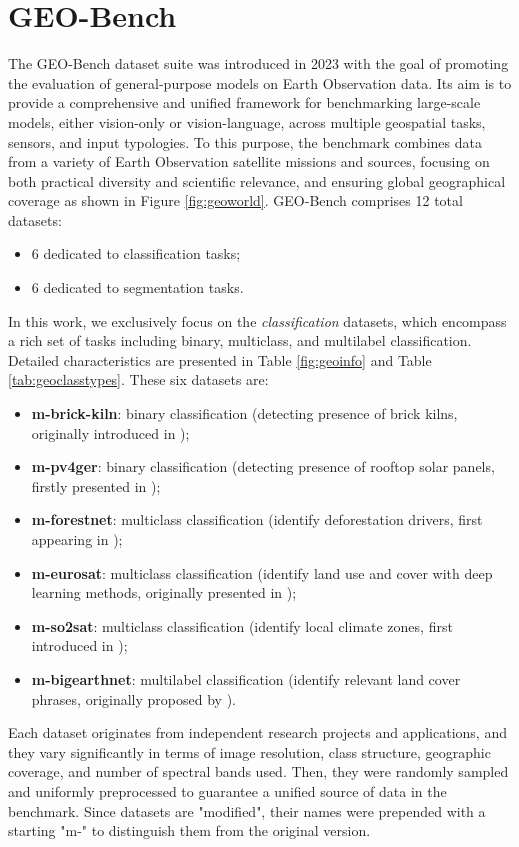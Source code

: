 \documentclass[a4paper, twoside, english]{sapthesis} %
\begin{document}
\section{GEO-Bench}

The GEO-Bench dataset suite \cite{lacoste2023geo} was introduced in 2023 with the goal of promoting the evaluation of general-purpose models on Earth Observation data. Its aim is to provide a comprehensive and unified framework for benchmarking large-scale models, either vision-only or vision-language, across multiple geospatial tasks, sensors, and input typologies. To this purpose, the benchmark combines data from a variety of Earth Observation satellite missions and sources, focusing on both practical diversity and scientific relevance, and ensuring global geographical coverage as shown in Figure \ref{fig:geoworld}. GEO-Bench comprises 12 total datasets:
\begin{itemize}
    \item 6 dedicated to classification tasks;
    \item 6 dedicated to segmentation tasks.
\end{itemize}
In this work, we exclusively focus on the \emph{classification} datasets, which encompass a rich set of tasks including binary, multiclass, and multilabel classification. Detailed characteristics are presented in Table \ref{fig:geoinfo} and Table \ref{tab:geoclasstypes}. These six datasets are:
\begin{itemize}
    \item \textbf{m-brick-kiln}: binary classification (detecting presence of brick kilns, originally introduced in \cite{lee2021scalable});
    \item \textbf{m-pv4ger}: binary classification (detecting presence of rooftop solar panels, firstly presented in \cite{mayer20223d});
    \item \textbf{m-forestnet}: multiclass classification (identify deforestation drivers, first appearing in \cite{irvin2020forestnet});
    \item \textbf{m-eurosat}: multiclass classification (identify land use and cover with deep learning methods, originally presented in \cite{helber2019eurosat});
    \item \textbf{m-so2sat}: multiclass classification (identify local climate zones, first introduced in  \cite{zhu2019so2sat});
    \item \textbf{m-bigearthnet}: multilabel classification (identify relevant land cover phrases, originally proposed by \cite{sumbul2021bigearthnet}).
\end{itemize}
Each dataset originates from independent research projects and applications, and they vary significantly in terms of image resolution, class structure, geographic coverage, and number of spectral bands used. Then, they were randomly sampled and uniformly preprocessed to guarantee a unified source of data in the benchmark. Since datasets are "modified", their names were prepended with a starting "m-" to distinguish them from the original version.
\end{document}

